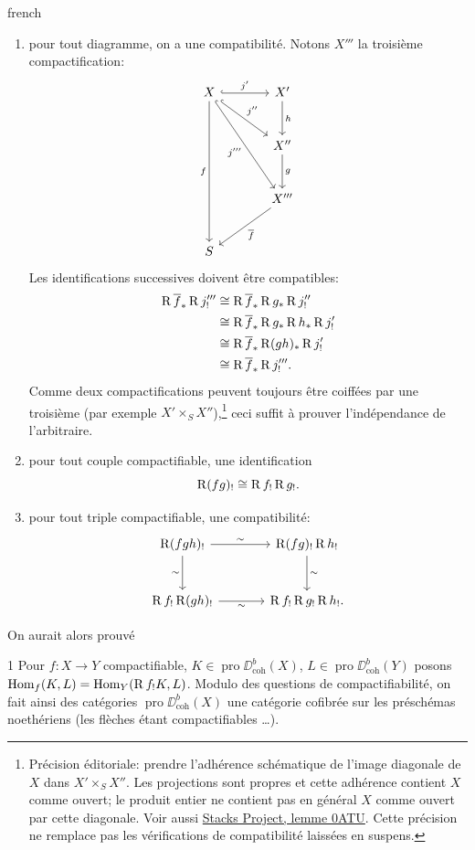 \begin{hyphenrules}{french}
\begin{enumerate}
\item[(a)] pour tout diagramme, on a une compatibilit\'e. Notons $X'''$ la troisi\`eme compactification:
\[
\begin{tikzcd}[row sep=large,column sep=large]
X \ar[r,hook,"j'"] \ar[dr,hook,"j''"] \ar[ddr,hook,"j'''"'] \ar[ddd,"f"']
 & X' \ar[d,"h"] \\
 & X'' \ar[d,"g"] \\
 & X''' \ar[dl,"\overline f"] \\
S
\end{tikzcd}
\]
Les identifications successives doivent \^etre compatibles:
\[
\begin{aligned}
\operatorname{R}\overline f_*\operatorname{R} j'''_!
&\cong\operatorname{R}\overline f_*\operatorname{R} g_*\operatorname{R} j''_!\\
&\cong\operatorname{R}\overline f_*\operatorname{R} g_*\operatorname{R} h_*\operatorname{R} j'_!\\
&\cong\operatorname{R}\overline f_*\operatorname{R}(gh)_*\operatorname{R} j'_!\\
&\cong\operatorname{R}\overline f_*\operatorname{R} j'''_!.
\end{aligned}
\]
Comme deux compactifications peuvent toujours \^etre coiff\'ees par une
troisi\`eme (par exemple $X'\times_S X''$),\footnote{Pr\'ecision \'editoriale: prendre l'adh\'erence sch\'ematique de l'image diagonale de $X$ dans $X'\times_S X''$. Les projections sont propres et cette adh\'erence contient $X$ comme ouvert; le produit entier ne contient pas en g\'en\'eral $X$ comme ouvert par cette diagonale. Voir aussi \href{https://stacks.math.columbia.edu/tag/0ATU}{Stacks Project, lemme 0ATU}. Cette pr\'ecision ne remplace pas les v\'erifications de compatibilit\'e laiss\'ees en suspens.} ceci suffit \`a prouver
l'ind\'ependance de l'arbitraire.
\item[(b)] pour tout couple compactifiable, une identification
\[
\operatorname{R}(fg)_!\cong\operatorname{R} f_!\operatorname{R} g_!.
\]
\item[(c)] pour tout triple compactifiable, une compatibilit\'e:
\[
\begin{tikzcd}[row sep=large,column sep=large]
\RR(fgh)_! \ar[r,"\sim"] \ar[d,"\sim"']
 & \RR(fg)_!\RR h_! \ar[d,"\sim"] \\
\RR f_!\RR(gh)_! \ar[r,"\sim"']
 & \RR f_!\RR g_!\RR h_!.
\end{tikzcd}
\]
\end{enumerate}

On aurait alors prouv\'e

\begin{booktheorem}{1}\label{app:thm1}
Pour $f: X \longrightarrow Y$ compactifiable, $K \in \operatorname{pro}\DD_{\operatorname{coh}}^{b}(X)$, $L \in \operatorname{pro}\DD_{\operatorname{coh}}^{b}(Y)$ posons $\operatorname{Hom}_{f}(K,L) = \operatorname{Hom}_{Y}(\operatorname{R} f_{!}K,L)$. Modulo des questions de compactifiabilit\'e, on fait ainsi des cat\'egories $\operatorname{pro}\DD_{\operatorname{coh}}^{b}(X)$ une cat\'egorie cofibr\'ee sur les pr\'esch\'emas noeth\'eriens (les fl\`eches \'etant compactifiables \dots).
\end{booktheorem}


\end{hyphenrules}
